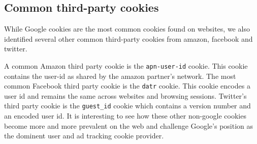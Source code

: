 \subsection{Common third-party cookies}
While Google cookies are the most common cookies found on websites, we also identified several other common third-party cookies from amazon, facebook and twitter.

A common Amazon third party cookie is the \texttt{apn-user-id} cookie. This cookie contains the user-id as shared by the amazon partner's network. The most common Facebook third party cookie is the \texttt{datr} cookie. This cookie encodes a user id and remains the same across websites and browsing sessions. Twitter's third party cookie is the \texttt{guest\_id} cookie which contains a version number and an encoded user id. It is interesting to see how these other non-google cookies become more and more prevalent on the web and challenge Google's position as the dominent user and ad tracking cookie provider.





